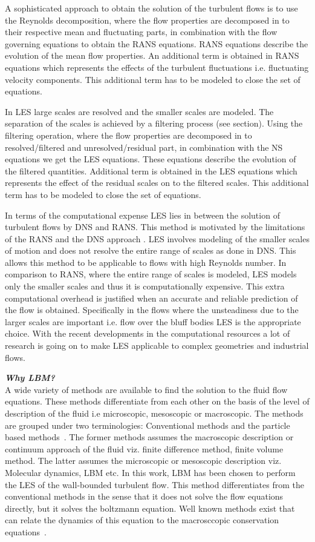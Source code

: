 A sophisticated approach to obtain the solution of the turbulent flows is to use the Reynolds decomposition, where the flow properties are decomposed in to their respective mean and fluctuating parts, in combination with the flow governing equations to obtain the RANS equations. RANS equations describe the evolution of the mean flow properties. An additional term is obtained in RANS equations which represents the effects of the turbulent fluctuations i.e. fluctuating velocity components. This additional term has to be modeled to close the set of equations. 

In LES large scales are resolved and the smaller scales are modeled. The separation of the scales is achieved by a filtering process (see section). Using the filtering operation, where the flow properties are decomposed in to resolved/filtered and unresolved/residual part, in combination with the NS equations we get the LES equations. These equations describe the evolution of the filtered quantities. Additional term is obtained in the LES equations which represents the effect of the residual scales on to the filtered scales. This additional term has to be modeled to close the set of equations.

In terms of the computational expense LES lies in between the solution of turbulent flows by DNS and RANS. This method is motivated by the limitations of the RANS and the DNS approach \cite{pope:book}. LES involves modeling of the smaller scales of motion and does not resolve the entire range of scales as done in DNS. This allows this method to be applicable to flows with high Reynolds number. In comparison to RANS, where the entire range of scales is modeled, LES models only the smaller scales and thus it is computationally expensive. This extra computational overhead is justified when an accurate and reliable prediction of the flow is obtained. Specifically in the flows where the unsteadiness due to the larger scales are important i.e. flow over the bluff bodies LES is the appropriate choice. With the recent developments in the computational resources a lot of research is going on to make LES applicable to complex geometries and industrial flows.

\textbf{\emph{Why LBM?}}\\
A wide variety of methods are available to find the solution to the fluid flow equations. These methods differentiate from each other on the basis of the level of description of the fluid i.e microscopic, mesoscopic  or macroscopic. The methods are grouped under two terminologies: Conventional methods and the particle based methods~\cite{krueger:book}. The former methods assumes the macroscopic description or continuum approach of the fluid viz. finite difference method, finite volume method. The latter assumes the microscopic or mesoscopic description viz. Molecular dynamics, LBM etc. In this work, LBM has been chosen to perform the LES of the wall-bounded turbulent flow. This method differentiates from the conventional methods in the sense that it does not solve the flow equations directly, but it solves the boltzmann equation. Well known methods exist that can relate the dynamics of this equation to the macrosccopic conservation equations~\cite{krueger:book}. 

